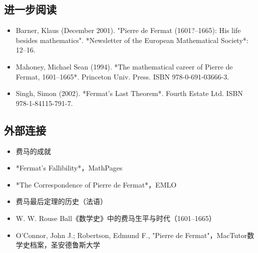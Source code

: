 \subsection{进一步阅读}  
\begin{itemize}
\item Barner, Klaus (December 2001). "Pierre de Fermat (1601?–1665): His life besides mathematics". *Newsletter of the European Mathematical Society*: 12–16.  
\item Mahoney, Michael Sean (1994). *The mathematical career of Pierre de Fermat, 1601–1665*. Princeton Univ. Press. ISBN 978-0-691-03666-3.  
\item Singh, Simon (2002). *Fermat's Last Theorem*. Fourth Estate Ltd. ISBN 978-1-84115-791-7.
\end{itemize}
\subsection{外部连接}
\begin{itemize}
\item 费马的成就  
\item *Fermat's Fallibility*，MathPages  
\item *The Correspondence of Pierre de Fermat*，EMLO  
\item 费马最后定理的历史（法语）  
\item W. W. Rouse Ball《数学史》中的费马生平与时代（1601–1665）  
\item O'Connor, John J.; Robertson, Edmund F., "Pierre de Fermat"，MacTutor数学史档案，圣安德鲁斯大学
\end{itemize}